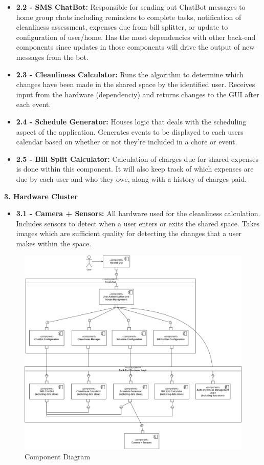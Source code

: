 \documentclass{scrreprt}
\theoremstyle{definition}
\begin{document}
\begin{flushleft}
\begin{itemize}
  	\item \textbf{2.2 - SMS ChatBot:} Responsible for sending out ChatBot messages to home group chats including reminders to complete tasks, notification of cleanliness assessment, expenses due from bill splitter, or update to configuration of user/home. Has the most dependencies with other back-end components since updates in those components will drive the output of new messages from the bot.
  	\item \textbf{2.3 - Cleanliness Calculator:} Runs the algorithm to determine which changes have been made in the shared space by the identified user. Receives input from the hardware (dependenciy) and returns changes to the GUI after each event.
  	\item \textbf{2.4 - Schedule Generator:} Houses logic that deals with the scheduling aspect of the application. Generates events to be displayed to each users calendar based on whether or not they're included in a chore or event.
  	\item \textbf{2.5 - Bill Split Calculator:} Calculation of charges due for shared expenses is done within this component. It will also keep track of which expenses are due by each user and who they owe, along with a history of charges paid.
  \end{itemize}
  \item \textbf{3. Hardware Cluster}
  \begin{itemize}
  	\item \textbf{3.1 - Camera + Sensors:} All hardware used for the cleanliness calculation. Includes sensors to detect when a user enters or exits the shared space. Takes images which are sufficient quality for detecting the changes that a user makes within the space.
  \end{itemize}
\end{flushleft}

\begin{figure}[H]
    \includegraphics[width=\linewidth]{./img/component-diagram.png}
    \caption{Component Diagram}
    \label{fig: High level component diagram}
\end{figure}
\end{document}
